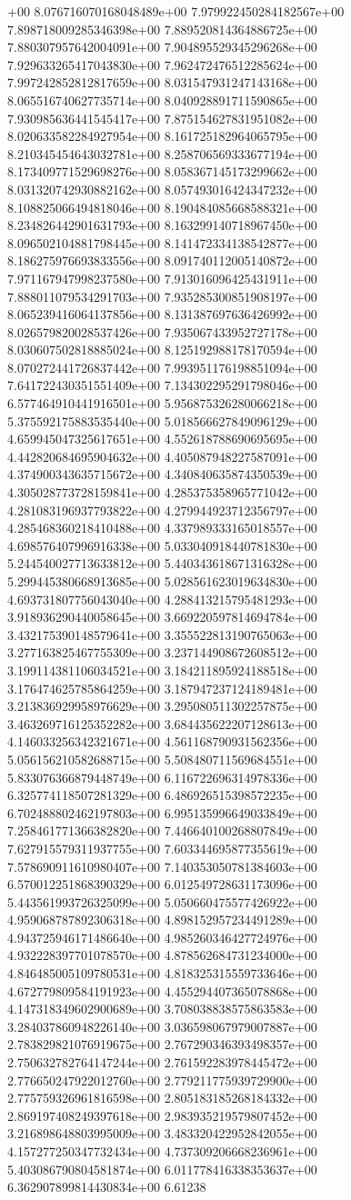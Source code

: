 +00	8.076716070168048489e+00	7.979922450284182567e+00	7.898718009285346398e+00	7.889520814364886725e+00	7.880307957642004091e+00	7.904895529345296268e+00	7.929633265417043830e+00	7.962472476512285624e+00	7.997242852812817659e+00	8.031547931247143168e+00	8.065516740627735714e+00	8.040928891711590865e+00	7.930985636441545417e+00	7.875154627831951082e+00	8.020633582284927954e+00	8.161725182964065795e+00	8.210345454643032781e+00	8.258706569333677194e+00	8.173409771529698276e+00	8.058367145173299662e+00	8.031320742930882162e+00	8.057493016424347232e+00	8.108825066494818046e+00	8.190484085668588321e+00	8.234826442901631793e+00	8.163299140718967450e+00	8.096502104881798445e+00	8.141472334138542877e+00	8.186275976693833556e+00	8.091740112005140872e+00	7.971167947998237580e+00	7.913016096425431911e+00	7.888011079534291703e+00	7.935285300851908197e+00	8.065239416064137856e+00	8.131387697636426992e+00	8.026579820028537426e+00	7.935067433952727178e+00	8.030607502818885024e+00	8.125192988178170594e+00	8.070272441726837442e+00	7.993951176198851094e+00	7.641722430351551409e+00	7.134302295291798046e+00	6.577464910441916501e+00	5.956875326280066218e+00	5.375592175883535440e+00	5.018566627849096129e+00	4.659945047325617651e+00	4.552618788690695695e+00	4.442820684695904632e+00	4.405087948227587091e+00	4.374900343635715672e+00	4.340840635874350539e+00	4.305028773728159841e+00	4.285375358965771042e+00	4.281083196937793822e+00	4.279944923712356797e+00	4.285468360218410488e+00	4.337989333165018557e+00	4.698576407996916338e+00	5.033040918440781830e+00	5.244540027713633812e+00	5.440343618671316328e+00	5.299445380668913685e+00	5.028561623019634830e+00	4.693731807756043040e+00	4.288413215795481293e+00	3.918936290440058645e+00	3.669220597814694784e+00	3.432175390148579641e+00	3.355522813190765063e+00	3.277163825467755309e+00	3.237144908672608512e+00	3.199114381106034521e+00	3.184211895924188518e+00	3.176474625785864259e+00	3.187947237124189481e+00	3.213836929958976629e+00	3.295080511302257875e+00	3.463269716125352282e+00	3.684435622207128613e+00	4.146033256342321671e+00	4.561168790931562356e+00	5.056156210582688715e+00	5.508480711569684551e+00	5.833076366879448749e+00	6.116722696314978336e+00	6.325774118507281329e+00	6.486926515398572235e+00	6.702488802462197803e+00	6.995135996649033849e+00	7.258461771366382820e+00	7.446640100268807849e+00	7.627915579311937755e+00	7.603344695877355619e+00	7.578690911610980407e+00	7.140353050781384603e+00	6.570012251868390329e+00	6.012549728631173096e+00	5.443561993726325099e+00	5.050660475577426922e+00	4.959068787892306318e+00	4.898152957234491289e+00	4.943725946171486640e+00	4.985260346427724976e+00	4.932228397701078570e+00	4.878562684731234000e+00	4.846485005109780531e+00	4.818325315559733646e+00	4.672779809584191923e+00	4.455294407365078868e+00	4.147318349602900689e+00	3.708038838575863583e+00	3.284037860948226140e+00	3.036598067979007887e+00	2.783829821076919675e+00	2.767290346393498357e+00	2.750632782764147244e+00	2.761592283978445472e+00	2.776650247922012760e+00	2.779211775939729900e+00	2.775759326961816598e+00	2.805183185268184332e+00	2.869197408249397618e+00	2.983935219579807452e+00	3.216898648803995009e+00	3.483320422952842055e+00	4.157277250347732434e+00	4.737309206668236961e+00	5.403086790804581874e+00	6.011778416338353637e+00	6.362907899814430834e+00	6.61238